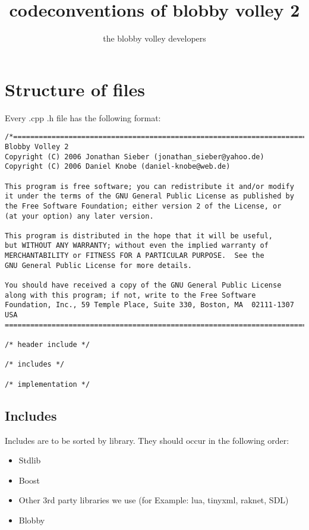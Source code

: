 \documentclass[a4paper]{scrartcl}
\title{codeconventions of blobby volley 2}
\author{the blobby volley developers}
\begin{document}
\begin{titlepage}
\maketitle
\thispagestyle{empty}
\end{titlepage}



\section{Structure of files}
Every .cpp .h file has the following format:
\begin{lstlisting}
/*=============================================================================
Blobby Volley 2
Copyright (C) 2006 Jonathan Sieber (jonathan_sieber@yahoo.de)
Copyright (C) 2006 Daniel Knobe (daniel-knobe@web.de)

This program is free software; you can redistribute it and/or modify
it under the terms of the GNU General Public License as published by
the Free Software Foundation; either version 2 of the License, or
(at your option) any later version.

This program is distributed in the hope that it will be useful,
but WITHOUT ANY WARRANTY; without even the implied warranty of
MERCHANTABILITY or FITNESS FOR A PARTICULAR PURPOSE.  See the
GNU General Public License for more details.

You should have received a copy of the GNU General Public License
along with this program; if not, write to the Free Software
Foundation, Inc., 59 Temple Place, Suite 330, Boston, MA  02111-1307  USA
=============================================================================*/

/* header include */

/* includes */

/* implementation */

\end{lstlisting}



\subsection{Includes}
Includes are to be sorted by library. They should occur in the following order:
\begin{itemize}
	\item Stdlib
	\item Boost
	\item Other 3rd party libraries we use (for Example: lua, tinyxml, raknet, SDL)
	\item Blobby
\end{itemize}
\end{document}
